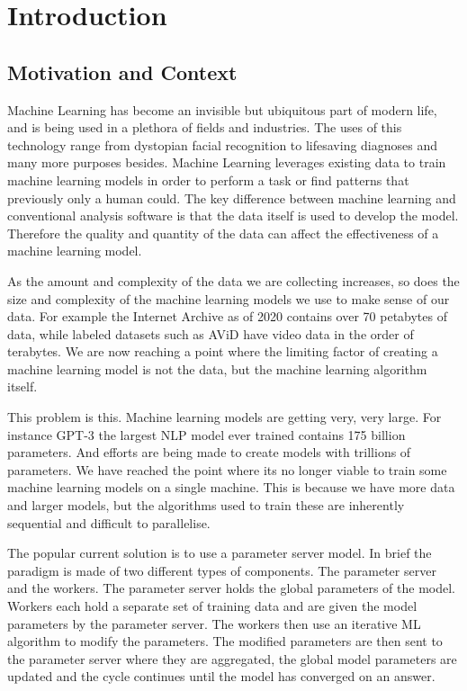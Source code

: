 
\section{Introduction}

\subsection{Motivation and Context}

Machine Learning has become an invisible but ubiquitous part of modern life, and
is being used in a plethora of fields and industries. The uses of this
technology range from dystopian facial recognition
\cite{mattBurgessFacialRecognision} to lifesaving diagnoses
\cite{Mammograms2020} and many more purposes besides. Machine Learning leverages
existing data to train machine learning models in order to perform a task or
find patterns that previously only a human could. The key difference between
machine learning and conventional analysis software is that the data itself is
used to develop the model. Therefore the quality and quantity of the data can
affect the effectiveness of a machine learning model.
\par
As the amount and complexity of the data we are collecting increases, so does the
size and complexity of the machine learning models we use to make sense of our
data. For example the Internet Archive as of 2020 contains over 70 petabytes of
data, while labeled datasets such as AViD have video data in the order of
terabytes. \cite{piergiovanni2020avid} We are now reaching a point where the
limiting factor of creating a machine learning model is not the data, but the
machine learning algorithm itself.
\par
This problem is this. Machine learning models are getting very, very large. For
instance GPT-3 the largest NLP model ever trained contains 175 billion
parameters. \cite{fewshowlearners2020gpt} And efforts are being made to create
models with trillions of parameters. \cite{rajbhandari2020zero} We have reached
the point where its no longer viable to train some machine learning models on a
single machine.\cite{LI2014ParameterServers} This is because we have more data
and larger models, but the algorithms used to train these are inherently
sequential and difficult to parallelise.
\par
The popular current solution is to use a parameter server model. In brief the
paradigm is made of two different types of components. The parameter server and
the workers. The parameter server holds the global parameters of the model.
Workers each hold a separate set of training data and are given the model
parameters by the parameter server. The workers then use an iterative ML
algorithm to modify the parameters. The modified parameters are then sent to the
parameter server where they are aggregated, the global model parameters are
updated and the cycle continues until the model has converged on an answer.

